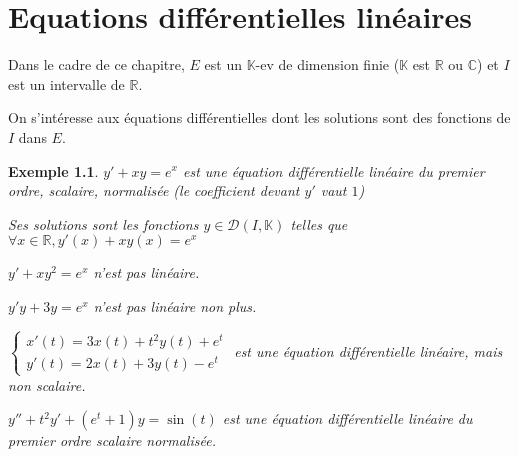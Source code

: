 \documentclass[a4paper,12pt]{book}
\newtheorem{Exe}{Exemple}[section]
\def\R{\mathbb{R}}
\def\C{\mathbb{C}}
\def\K{\mathbb{K}}
\begin{document}
\chapter{Equations différentielles linéaires}
Dans le cadre de ce chapitre, $E$ est un $\K$-ev de dimension finie ($\K$ est $\R$ ou $\C$) et $I$ est un intervalle de $\R$.
\par On s'intéresse aux équations différentielles dont les solutions sont des fonctions de $I$ dans $E$.
\begin{Exe}
$y'+xy = e^x$ est une équation différentielle linéaire du premier ordre, scalaire, normalisée (le coefficient devant $y'$ vaut $1$)
\par Ses solutions sont les fonctions $y\in\mathcal{D}(I,\K)$ telles que $\forall x\in\R, y'(x)+xy(x) =e^x$
\par $y' + xy^2=e^x$ n'est pas linéaire.
\par $y'y + 3y = e^x$ n'est pas linéaire non plus.
\par $\left\{\begin{array}{l} x'(t) = 3x(t) + t^2 y(t)+e^t \\ y'(t) = 2x(t) + 3y(t) - e^t\end{array}\right.$ est une équation différentielle linéaire, mais non scalaire.
\par $y'' +t^2y' + (e^t+1)y = \sin(t)$ est une équation différentielle linéaire du premier ordre scalaire normalisée.
\end{Exe}
\end{document}
